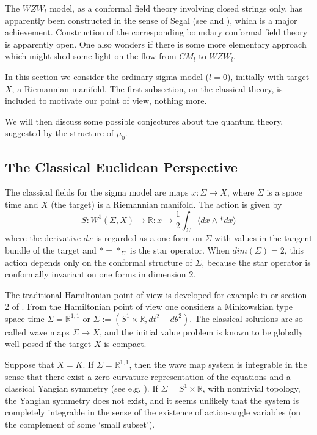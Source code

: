\documentclass{amsart}
\theoremstyle{conjecture}
\theoremstyle{definition}
\theoremstyle{question}
\theoremstyle{questions}
\theoremstyle{remark}
\theoremstyle{remarks}
\theoremstyle{example}
\numberwithin{equation}{section}
\begin{document}
The $WZW_l$ model, as a conformal field theory involving closed strings only, has apparently been constructed in the sense of Segal (see \cite{Kirillov1} and \cite{Kirillov2}), which is a major achievement. Construction of the corresponding boundary conformal field theory is apparently open. One also wonders if there is some
more elementary approach which might shed some light on the flow from $CM_l$ to $WZW_l$.

In this section we consider the ordinary sigma model ($l=0$), initially with target $X$, a Riemannian manifold.
The first subsection, on the classical theory, is included to motivate our point of view, nothing more.

We will then discuss some possible conjectures about the quantum theory, suggested by the structure of $\mu_0$.


\subsection{The Classical Euclidean Perspective}

The classical fields for the sigma model are maps $x:\Sigma\to X$, where $\Sigma$ is a space time and $X$ (the target)
is a Riemannian manifold. The action is given by
$$S: W^1(\Sigma,X)\to \mathbb R:x \to \frac 12\int_{\Sigma}\langle dx\wedge *dx\rangle$$
where the derivative $dx$ is regarded as a one form on $\Sigma$ with values in the tangent bundle of the target
and $*=*_{\Sigma}$ is the star operator. When $dim(\Sigma)=2$, this action depends only on the conformal
structure of $\Sigma$, because the star operator is conformally invariant on one forms in dimension 2.

The traditional Hamiltonian point of view is developed for example in \cite{Bernard} or section 2 of \cite{TU}.
From the Hamiltonian point of view one considers a Minkowskian type space time $\Sigma=\mathbb R^{1,1}$ or $\Sigma:=(S^1\times \mathbb R,dt^2-d\theta^2)$.  The classical solutions are so called wave maps $\Sigma \to X$, and the initial value problem is known to be globally well-posed if the target $X$ is compact.

Suppose that $X=K$. If $\Sigma=\mathbb R^{1,1}$, then the wave map system is integrable in the sense that there exist a zero curvature representation of the equations and a classical Yangian symmetry (see e.g. \cite{Bernard}). If $\Sigma=S^1\times \mathbb R$, with nontrivial topology, the Yangian symmetry does not exist, and it seems unlikely that the system is completely integrable in the sense of the existence of action-angle variables (on the complement of some `small subset').
\end{document}

